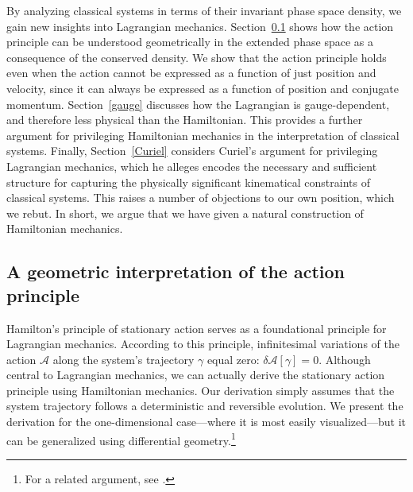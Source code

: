 \documentclass[12pt, english, twoside]{article} %
\begin{document}
By analyzing classical systems in terms of their invariant phase space density, we gain new insights into Lagrangian mechanics. Section~\ref{action} shows how the action principle can be understood geometrically in the extended phase space as a consequence of the conserved density. We show that the action principle holds even when the action cannot be expressed as a function of just position and velocity, since it can always be expressed as a function of position and conjugate momentum. Section~\ref{gauge} discusses how the Lagrangian is gauge-dependent, and therefore less physical than the Hamiltonian. This provides a further argument for privileging Hamiltonian mechanics in the interpretation of classical systems. Finally, Section~\ref{Curiel} considers Curiel's \parencites*[]{Curiel} argument for privileging Lagrangian mechanics, which he alleges encodes the necessary and sufficient structure for capturing the physically significant kinematical constraints of classical systems. This raises a number of objections to our own position, which we rebut. In short, we  argue that we have given a natural construction of Hamiltonian mechanics.


\subsection{A geometric interpretation of the action principle}
\label{action}


Hamilton's principle of stationary action serves as a foundational principle for Lagrangian mechanics. According to this principle, infinitesimal variations of the action $ \mathscr{A}$ along the system's trajectory $\gamma $ equal zero: $\delta  \mathscr{A}[\gamma] = 0 $. Although central to Lagrangian mechanics, we can actually derive the stationary action principle using Hamiltonian mechanics. Our derivation simply assumes that the system trajectory follows a deterministic and reversible evolution. We present the derivation for the one-dimensional case---where it is most easily visualized---but it can be generalized using differential geometry.\footnote{For a related argument, see \textcites[236--37, 243--45]{Arnold}.}
\end{document}
